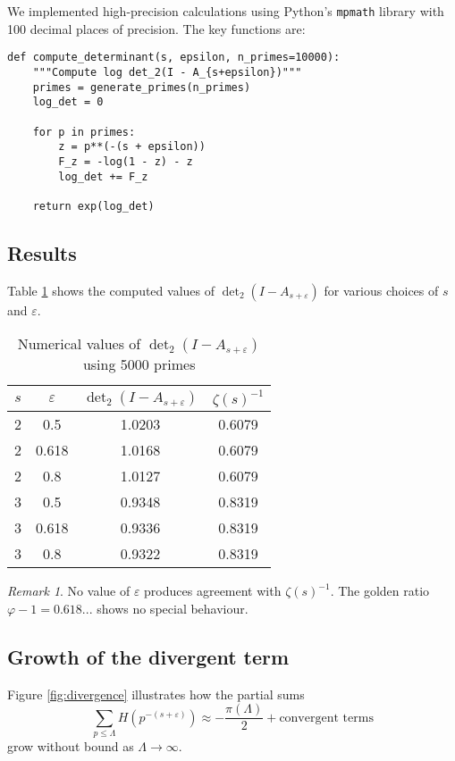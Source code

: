\documentclass[11pt,a4paper]{article}
\theoremstyle{definition}
\theoremstyle{remark}
\newtheorem{remark}[theorem]{Remark}
\DeclareMathOperator{\det}{det}
\begin{document}
We implemented high-precision calculations using Python's \texttt{mpmath} library 
with 100 decimal places of precision. The key functions are:

\begin{lstlisting}
def compute_determinant(s, epsilon, n_primes=10000):
    """Compute log det_2(I - A_{s+epsilon})"""
    primes = generate_primes(n_primes)
    log_det = 0
    
    for p in primes:
        z = p**(-(s + epsilon))
        F_z = -log(1 - z) - z
        log_det += F_z
    
    return exp(log_det)
\end{lstlisting}

\subsection{Results}

Table \ref{tab:numerical} shows the computed values of $\det_2(I - A_{s+\varepsilon})$ 
for various choices of $s$ and $\varepsilon$.

\begin{table}[ht]
\centering
\caption{Numerical values of $\det_2(I - A_{s+\varepsilon})$ using 5000 primes}
\label{tab:numerical}
\begin{tabular}{c|c|c|c}
$s$ & $\varepsilon$ & $\det_2(I - A_{s+\varepsilon})$ & $\zeta(s)^{-1}$ \\
\hline
2 & 0.5 & 1.0203 & 0.6079 \\
2 & 0.618 & 1.0168 & 0.6079 \\
2 & 0.8 & 1.0127 & 0.6079 \\
3 & 0.5 & 0.9348 & 0.8319 \\
3 & 0.618 & 0.9336 & 0.8319 \\
3 & 0.8 & 0.9322 & 0.8319 \\
\end{tabular}
\end{table}

\begin{remark}
No value of $\varepsilon$ produces agreement with $\zeta(s)^{-1}$. The golden ratio 
$\varphi - 1 = 0.618...$ shows no special behaviour.
\end{remark}

\subsection{Growth of the divergent term}

Figure \ref{fig:divergence} illustrates how the partial sums
\[
\sum_{p \leq \Lambda} H(p^{-(s+\varepsilon)}) \approx -\frac{\pi(\Lambda)}{2} + \text{convergent terms}
\]
grow without bound as $\Lambda \to \infty$.
\end{document}
